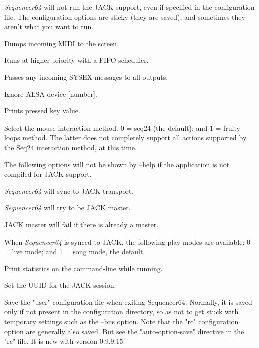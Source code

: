       \textsl{Sequencer64} will not run the JACK support, even if specified
      in the configuration file.  The configuration options are sticky (they
      are saved), and sometimes they aren't what you want to run.

      Dumps incoming MIDI to the screen.

      Runs at higher priority with a FIFO scheduler.

      Passes any incoming SYSEX messages to all outputs.

      Ignore ALSA device [number].

      Prints pressed key value.

      Select the mouse interaction method.
      0 = seq24 (the default); and 1 = fruity loops method.
      The latter does not completely support all actions supported by the Seq24
      interaction method, at this time.

      The following options will not be shown by --help if the application is
      not compiled for JACK support.

      \textsl{Sequencer64} will sync to JACK transport.

      \textsl{Sequencer64} will try to be JACK master.

      JACK master will fail if there is already a master.

      When \textsl{Sequencer64} is synced to JACK, the following play modes
      are available: 0 = live mode; and 1 = song mode, the default.

      Print statistics on the command-line while running.

      Set the UUID for the JACK session.

      Save the "user" configuration file when exiting Sequencer64.
      Normally, it is saved only if not present in the configuration directory,
      so as not to get stuck with temporary settings such as the --bus option.
      Note that the "rc" configuration option are generally also saved.
      But see the "auto-option-save" directive in the "rc" file.
      It is new with version 0.9.9.15.

